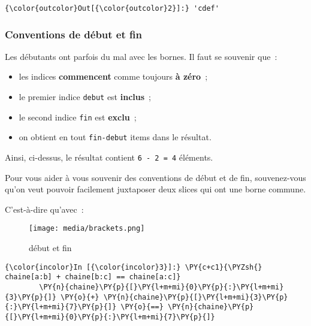 \begin{Verbatim}[commandchars=\\\{\},frame=single,framerule=0.3mm,rulecolor=\color{cellframecolor}]
{\color{outcolor}Out[{\color{outcolor}2}]:} 'cdef'
\end{Verbatim}
            
    \hypertarget{conventions-de-duxe9but-et-fin}{%
\subsubsection{Conventions de début et
fin}\label{conventions-de-duxe9but-et-fin}}

    Les débutants ont parfois du mal avec les bornes. Il faut se souvenir
que~:

\begin{itemize}
\tightlist
\item
  les indices \textbf{commencent} comme toujours \textbf{à zéro}~;
\item
  le premier indice \texttt{debut} est \textbf{inclus}~;
\item
  le second indice \texttt{fin} est \textbf{exclu}~;
\item
  on obtient en tout \texttt{fin-debut} items dans le résultat.
\end{itemize}

Ainsi, ci-dessus, le résultat contient \texttt{6\ -\ 2\ =\ 4} éléments.

    Pour vous aider à vous souvenir des conventions de début et de fin,
souvenez-vous qu'on veut pouvoir facilement juxtaposer deux slices qui
ont une borne commune.

C'est-à-dire qu'avec~:

    \begin{figure}
\centering
\texttt{[image: media/brackets.png]}
\caption{début et fin}
\end{figure}

    \begin{Verbatim}[commandchars=\\\{\},frame=single,framerule=0.3mm,rulecolor=\color{cellframecolor}]
{\color{incolor}In [{\color{incolor}3}]:} \PY{c+c1}{\PYZsh{} chaine[a:b] + chaine[b:c] == chaine[a:c]}
        \PY{n}{chaine}\PY{p}{[}\PY{l+m+mi}{0}\PY{p}{:}\PY{l+m+mi}{3}\PY{p}{]} \PY{o}{+} \PY{n}{chaine}\PY{p}{[}\PY{l+m+mi}{3}\PY{p}{:}\PY{l+m+mi}{7}\PY{p}{]} \PY{o}{==} \PY{n}{chaine}\PY{p}{[}\PY{l+m+mi}{0}\PY{p}{:}\PY{l+m+mi}{7}\PY{p}{]}
\end{Verbatim}


